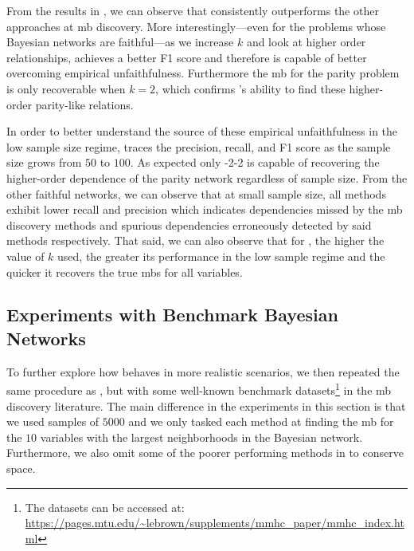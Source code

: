 \documentclass[accepted]{uai2026} %
\theoremstyle{plain}
\theoremstyle{definition}
\theoremstyle{remark}
\begin{document}
From the results in , we can observe that {\method}
consistently outperforms the other approaches at \gls{mb}
discovery. More interestingly---even for the problems whose Bayesian
networks are faithful---as we increase $k$ and look at higher order
relationships, {\method} achieves a better F1 score and therefore is
capable of better overcoming empirical unfaithfulness. Furthermore the
\gls{mb} for the parity problem is only recoverable when $k=2$, which
confirms {\method}'s ability to find these higher-order parity-like
relations.

In order to better understand the source of these empirical
unfaithfulness in the low sample size regime, 
traces the precision, recall, and F1 score as the sample size grows from
$50$ to $100$. As expected only {\method}-2-2 is capable of recovering
the higher-order dependence of the parity network regardless of sample
size. From the other faithful networks, we can observe that at small
sample size, all methods exhibit lower recall and precision which
indicates dependencies missed by the \gls{mb} discovery methods and
spurious dependencies erroneously detected by said methods respectively.
That said, we can also observe that for {\method}, the higher the value
of $k$ used, the greater its performance in the low sample regime and
the quicker it recovers the true \glspl{mb} for all variables.



\subsection{Experiments with Benchmark Bayesian
  Networks}\label{sec:exp-real}

To further explore how {\method} behaves in more realistic scenarios, we
then repeated the same procedure as , but with some
well-known benchmark datasets\footnote{The datasets can be accessed at:
  \url{https://pages.mtu.edu/~lebrown/supplements/mmhc_paper/mmhc_index.html}}
in the \gls{mb} discovery literature. The main difference in the
experiments in this section is that we used samples of $5000$ and we
only tasked each method at finding the \gls{mb} for the $10$ variables
with the largest neighborhoods in the Bayesian network.  Furthermore, we
also omit some of the poorer performing methods in  to
conserve space.
\end{document}
